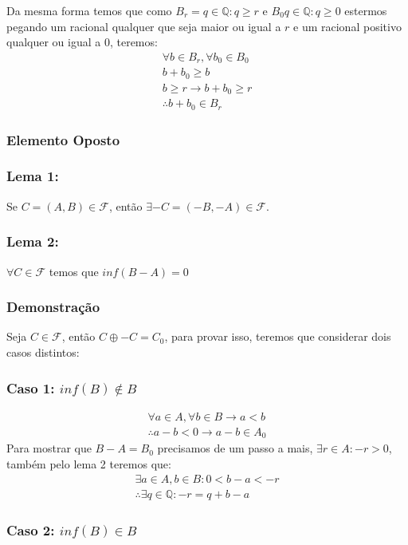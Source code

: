 \documentclass{article}
\begin{document}
    Da mesma forma temos que como $B_r = {q\in\mathbb{Q} :
    q\geq r}$ e $B_0 {q\in\mathbb{Q} : q\geq 0}$ estermos pegando
    um racional qualquer que seja maior ou igual a $r$ e um 
    racional positivo qualquer ou igual a 0, teremos:
    \begin{equation*}
        \begin{aligned}
            \forall b\in B_r, \forall b_0\in B_0 \\
            b + b_0 \geq b \\
            b \geq r \rightarrow b + b_0 \geq r \\
            \therefore b + b_0 \in B_r
        \end{aligned} 
    \end{equation*}

    \subsubsection*{Elemento Oposto}
    \subsubsection*{Lema 1:}
    Se $C = (A,B)\in\mathcal{F}$, então $\exists -C = (-B,-A)
    \in\mathcal{F}$.

    \subsubsection*{Lema 2:}
    $\forall C\in\mathcal{F}$ temos que $inf(B-A) = 0$

    \subsubsection*{Demonstração}
    Seja $C\in\mathcal{F}$, então $C\oplus-C = C_0$, para provar
    isso, teremos que considerar dois casos distintos:

    \subsubsection*{Caso 1: $inf(B)\notin B$}
    \begin{equation*}
        \begin{aligned}
            \forall a\in A, \forall b\in B \rightarrow a < b \\
            \therefore a - b < 0 \rightarrow a - b\in A_0 
        \end{aligned}
    \end{equation*}
    Para mostrar que $B-A = B_0$ precisamos de um passo a mais,
    $\exists r\in A : -r > 0$, também pelo lema 2 teremos que:
    \begin{equation*}
        \begin{aligned}
            \exists a\in A, b\in B : 0 < b - a < - r \\
            \therefore\exists q\in\mathbb{Q} : -r = q + b - a
        \end{aligned}
    \end{equation*} 

    \subsubsection*{Caso 2: $inf(B)\in B$}
\end{document}
